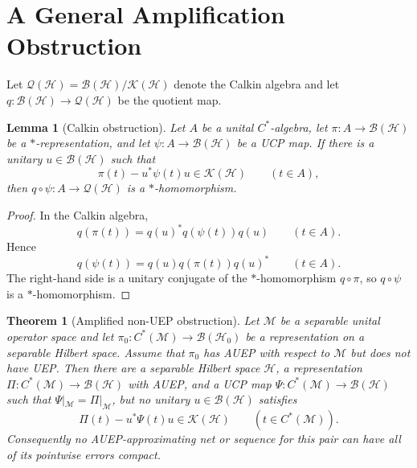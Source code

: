 \documentclass[11pt]{article}
\newtheorem{theorem}{Theorem}
\newtheorem{lemma}{Lemma}
\newcommand{\B}{\mathcal B}
\newcommand{\Hh}{\mathcal H}
\newcommand{\K}{\mathcal K}
\newcommand{\M}{\mathcal M}
\newcommand{\Q}{\mathcal Q}
\newcommand{\Cstar}{C^*}
\begin{document}
\section{A General Amplification Obstruction}

Let $\Q(\Hh)=\B(\Hh)/\K(\Hh)$ denote the Calkin algebra and let
$q:\B(\Hh)\to\Q(\Hh)$ be the quotient map.

\begin{lemma}[Calkin obstruction]\label{lem:calkin}
Let $A$ be a unital $C^*$-algebra, let $\pi:A\to\B(\Hh)$ be a
$*$-representation, and let $\psi:A\to\B(\Hh)$ be a UCP map.  If there is a
unitary $u\in\B(\Hh)$ such that
\[
   \pi(t)-u^*\psi(t)u\in \K(\Hh) \qquad (t\in A),
\]
then $q\circ\psi:A\to\Q(\Hh)$ is a $*$-homomorphism.
\end{lemma}

\begin{proof}
In the Calkin algebra,
\[
   q(\pi(t))=q(u)^*q(\psi(t))q(u) \qquad (t\in A).
\]
Hence
\[
   q(\psi(t))=q(u)q(\pi(t))q(u)^* \qquad (t\in A).
\]
The right-hand side is a unitary conjugate of the $*$-homomorphism $q\circ\pi$,
so $q\circ\psi$ is a $*$-homomorphism.
\end{proof}

\begin{theorem}[Amplified non-UEP obstruction]\label{thm:general}
Let $\M$ be a separable unital operator space and let
$\pi_0:\Cstar(\M)\to\B(\Hh_0)$ be a representation on a separable Hilbert space.
Assume that $\pi_0$ has AUEP with respect to $\M$ but does not have UEP.
Then there are a separable Hilbert space $\Hh$, a representation
$\Pi:\Cstar(\M)\to\B(\Hh)$ with AUEP, and a UCP map
$\Psi:\Cstar(\M)\to\B(\Hh)$ such that $\Psi|_\M=\Pi|_\M$, but no unitary
$u\in\B(\Hh)$ satisfies
\[
   \Pi(t)-u^*\Psi(t)u\in\K(\Hh) \qquad (t\in \Cstar(\M)).
\]
Consequently no AUEP-approximating net or sequence for this pair can have all
of its pointwise errors compact.
\end{theorem}
\end{document}
